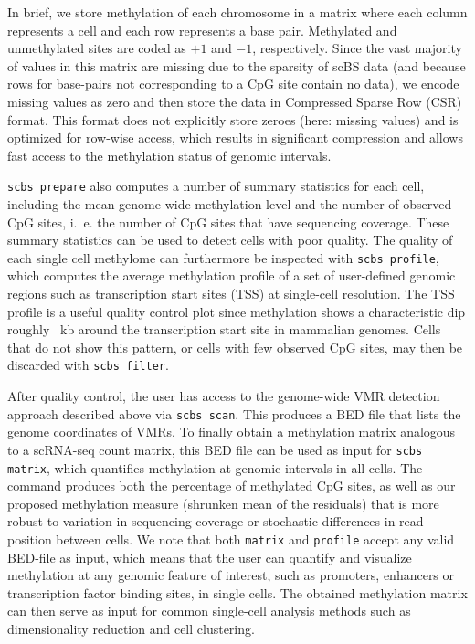 \documentclass[twocolumn,10pt]{article}
\begin{document}
In brief, we store methylation of each chromosome in a matrix where each column represents a cell and each row represents a base pair. Methylated and unmethylated sites are coded as $+1$ and $-1$, respectively. Since the vast majority of values in this matrix are missing due to the sparsity of scBS data (and because rows for base-pairs not corresponding to a CpG site contain no data), we encode missing values as zero and then store the data in Compressed Sparse Row (CSR) format. This format does not explicitly store zeroes (here: missing values) and is optimized for row-wise access, which results in significant compression and allows fast access to the methylation status of genomic intervals.

\texttt{scbs prepare} also computes a number of summary statistics for each cell, including the mean genome-wide methylation level and the number of observed CpG sites, i.~e. the number of CpG sites that have sequencing coverage. These summary statistics can be used to detect cells with poor quality. The quality of each single cell methylome can furthermore be inspected with \texttt{scbs profile}, which computes the average methylation profile of a set of user-defined genomic regions such as transcription start sites (TSS) at single-cell resolution. The TSS profile is a useful quality control plot since methylation shows a characteristic dip roughly ~kb around the transcription start site in mammalian genomes. Cells that do not show this pattern, or cells with few observed CpG sites, may then be discarded with \texttt{scbs filter}. 

After quality control, the user has access to the genome-wide VMR detection approach described above via \texttt{scbs scan}. This produces a BED file that lists the genome coordinates of VMRs. To finally obtain a methylation matrix analogous to a scRNA-seq count matrix, this BED file can be used as input for \texttt{scbs matrix}, which quantifies methylation at genomic intervals in all cells. The command produces both the percentage of methylated CpG sites, as well as our proposed methylation measure (shrunken mean of the residuals) that is more robust to variation in sequencing coverage or stochastic differences in read position between cells. We note that both \texttt{matrix} and \texttt{profile} accept any valid BED-file as input, which means that the user can quantify and visualize methylation at any genomic feature of interest, such as promoters, enhancers or transcription factor binding sites, in single cells. The obtained methylation matrix can then serve as input for common single-cell analysis methods such as dimensionality reduction and cell clustering.
\end{document}
